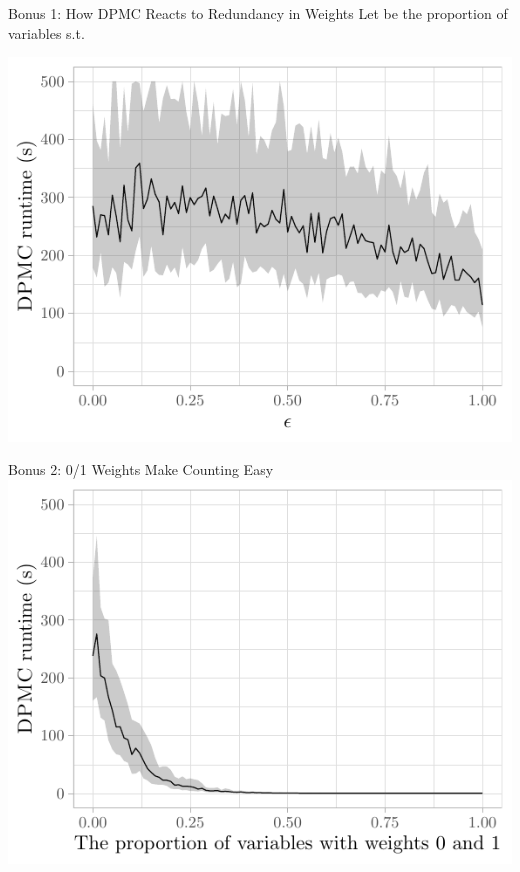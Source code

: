 \documentclass{beamer}
\begin{document}
\begin{frame}{Bonus 1: How \textsc{DPMC} Reacts to Redundancy in Weights}
  Let \structure{$\epsilon$} be the proportion of variables  s.t.

  \centering
  \includegraphics{epsilon}
\end{frame}

\begin{frame}{Bonus 2: 0/1 Weights Make Counting Easy}
  \centering
  \includegraphics{delta}
\end{frame}
\end{document}
